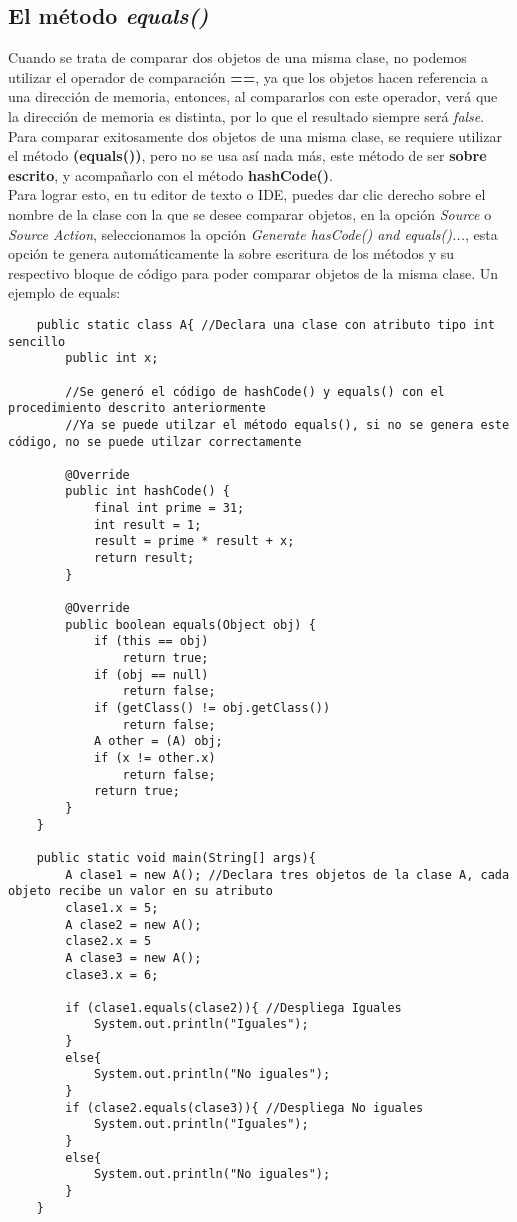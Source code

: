 \subsection{El método \textit{equals()}}
Cuando se trata de comparar dos objetos de una misma clase, no podemos utilizar el operador de comparación \textbf{==}, ya que los objetos hacen referencia a una dirección de memoria, entonces, al compararlos con este operador, verá que la dirección de memoria es distinta, por lo que el resultado siempre será \textit{false}. Para comparar exitosamente dos objetos de una misma clase, se requiere utilizar el método \textbf{(equals())}, pero no se usa así nada más, este método de ser \textbf{sobre escrito}, y acompañarlo con el método \textbf{hashCode()}.\\
Para lograr esto, en tu editor de texto o IDE, puedes dar clic derecho sobre el nombre de la clase con la que se desee comparar objetos, en la opción \textit{Source} o \textit{Source Action}, seleccionamos la opción \textit{Generate hasCode() and equals()...}, esta opción te genera automáticamente la sobre escritura de los métodos y su respectivo bloque de código para poder comparar objetos de la misma clase. Un ejemplo de equals:
\begin{lstlisting}
    public static class A{ //Declara una clase con atributo tipo int sencillo
        public int x;
        
        //Se generó el código de hashCode() y equals() con el procedimiento descrito anteriormente
        //Ya se puede utilzar el método equals(), si no se genera este código, no se puede utilzar correctamente
        
        @Override
        public int hashCode() {
            final int prime = 31;
            int result = 1;
            result = prime * result + x;
            return result;
        }

        @Override
        public boolean equals(Object obj) {
            if (this == obj)
                return true;
            if (obj == null)
                return false;
            if (getClass() != obj.getClass())
                return false;
            A other = (A) obj;
            if (x != other.x)
                return false;
            return true;
        }
    }
    
    public static void main(String[] args){
        A clase1 = new A(); //Declara tres objetos de la clase A, cada objeto recibe un valor en su atributo
        clase1.x = 5;
        A clase2 = new A();
        clase2.x = 5
        A clase3 = new A();
        clase3.x = 6;
        
        if (clase1.equals(clase2)){ //Despliega Iguales
            System.out.println("Iguales"); 
        }
        else{
            System.out.println("No iguales");
        }
        if (clase2.equals(clase3)){ //Despliega No iguales
            System.out.println("Iguales");
        }
        else{
            System.out.println("No iguales");
        }
    }
\end{lstlisting}

